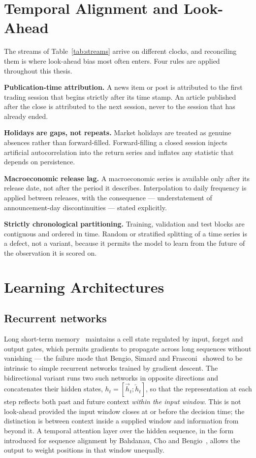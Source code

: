\section{Temporal Alignment and Look-Ahead}

The streams of Table~\ref{tab:streams} arrive on different clocks, and reconciling them is
where look-ahead bias most often enters. Four rules are applied throughout this thesis.

\textbf{Publication-time attribution.} A news item or post is attributed to the first trading
session that begins strictly after its time stamp. An article published after the close is
attributed to the next session, never to the session that has already ended.

\textbf{Holidays are gaps, not repeats.} Market holidays are treated as genuine absences rather
than forward-filled. Forward-filling a closed session injects artificial autocorrelation into
the return series and inflates any statistic that depends on persistence.

\textbf{Macroeconomic release lag.} A macroeconomic series is available only after its release
date, not after the period it describes. Interpolation to daily frequency is applied between
releases, with the consequence --- understatement of announcement-day discontinuities ---
stated explicitly.

\textbf{Strictly chronological partitioning.} Training, validation and test blocks are
contiguous and ordered in time. Random or stratified splitting of a time series is a defect,
not a variant, because it permits the model to learn from the future of the observation it is
scored on.

\section{Learning Architectures}

\subsection{Recurrent networks}

Long short-term memory~\cite{hochreiter1997} maintains a cell state regulated by input, forget
and output gates, which permits gradients to propagate across long sequences without vanishing
--- the failure mode that Bengio, Simard and Frasconi~\cite{bengio1994} showed to be intrinsic to
simple recurrent networks trained by gradient descent. The bidirectional variant runs two such
networks in opposite directions and concatenates their hidden states,
$h_t = [\overrightarrow{h}_t; \overleftarrow{h}_t]$, so that the representation at each step
reflects both past and future context \emph{within the input window}. This is not look-ahead
provided the input window closes at or before the decision time; the distinction is between
context inside a supplied window and information from beyond it. A temporal attention layer over
the hidden sequence, in the form introduced for sequence alignment by Bahdanau, Cho and
Bengio~\cite{bahdanau2015}, allows the output to weight positions in that window unequally.


